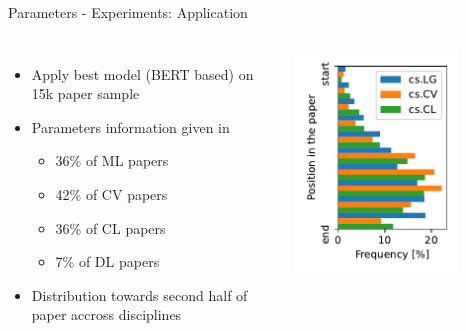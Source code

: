 \documentclass[en,16:9,smallfoot]{sdqbeamer}
\begin{document}
   \begin{frame}{Parameters - Experiments: Application}
   \begin{columns}
        \vspace{-1.5em}
        \begin{itemize}
        \item Apply best model (BERT based) on 15k paper sample
        \item Parameters information given in
        \begin{itemize}
            \item 36\% of ML papers
            \item 42\% of CV papers
            \item 36\% of CL papers
            \item 7\% of DL papers
        \end{itemize}
        \item Distribution towards second half of paper accross disciplines
        \end{itemize}
          \centering
           \includegraphics[width=0.75\textwidth]{imgs/hyperparam_pos}
   \end{columns}
   \end{frame}
\end{document}
